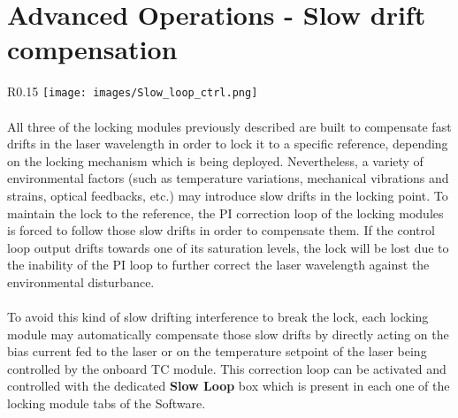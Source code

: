 \section{Advanced Operations - Slow drift compensation} \label{Slow_loop_chapter}
\begin{wrapfigure}{R}{0.15\textwidth}
    \vspace{-20pt}
    \texttt{[image: images/Slow\_loop\_ctrl.png]}
\end{wrapfigure}
\paragraph{} All three of the locking modules previously described are built to compensate fast drifts in the laser wavelength in order to lock it to a specific reference, depending on the locking mechanism which is being deployed. 
\newline Nevertheless, a variety of environmental factors (such as temperature variations, mechanical vibrations and strains, optical feedbacks, etc.) may introduce slow drifts in the locking point. To maintain the lock to the reference, the PI correction loop of the locking modules is forced to follow those slow drifts in order to compensate them. If the control loop output drifts towards one of its saturation levels, the lock will be lost due to the inability of the PI loop to further correct the laser wavelength against the environmental disturbance.

\paragraph{} To avoid this kind of slow drifting interference to break the lock, each locking module may automatically compensate those slow drifts by directly acting on the bias current fed to the laser or on the temperature setpoint of the laser being controlled by the onboard TC module. This correction loop can be activated and controlled with the dedicated \textbf{Slow Loop} box which is present in each one of the locking module tabs of the  \SoftwareType Software.

